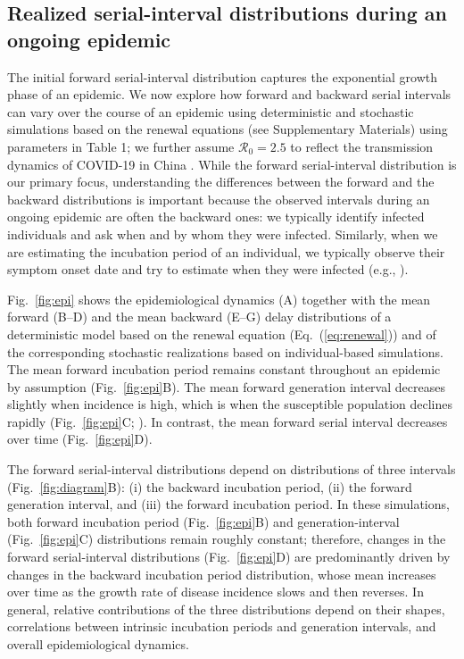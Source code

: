 \documentclass[12pt]{article}
\newcommand{\eref}[1]{Eq.~(\ref{eq:#1})}
\newcommand{\fref}[1]{Fig.~\ref{fig:#1}}
\newcommand{\Rx}[1]{\ensuremath{{\mathcal R}_{#1}}\xspace}
\newcommand{\Ro}{\Rx{0}}
\begin{document}
\subsection{Realized serial-interval distributions during an ongoing epidemic}

The initial forward serial-interval distribution captures the exponential growth phase of an epidemic.
We now explore how forward and backward serial intervals can vary over the course of an epidemic using deterministic and stochastic simulations based on the renewal equations (see Supplementary Materials) using parameters in Table 1;
we further assume $\Ro=2.5$ to reflect the transmission dynamics of COVID-19 in China \citep{doi:10.1098/rsif.2020.0144}.
While the forward serial-interval distribution is our primary focus, understanding the differences between the forward and the backward distributions is important because the observed intervals during an ongoing epidemic are often the backward ones:
we typically identify infected individuals and ask when and by whom they were infected.
Similarly, when we are estimating the incubation period of an individual, we typically observe their symptom onset date and try to estimate when they were infected (e.g., \cite{backer2020incubation}).

\fref{epi} shows the epidemiological dynamics (A) together with the mean forward (B--D) and the mean backward (E--G) delay distributions of a deterministic model based on the renewal equation (\eref{renewal}) and of the corresponding stochastic realizations based on individual-based simulations.
The mean forward incubation period remains constant throughout an epidemic by assumption (\fref{epi}B).
The mean forward generation interval decreases slightly when incidence is high, which is when the susceptible population declines rapidly (\fref{epi}C; \cite{kenah2008generation, champredon2015intrinsic}).
In contrast, the mean forward serial interval decreases over time (\fref{epi}D).

The forward serial-interval distributions depend on distributions of three intervals
(\fref{diagram}B): (i) the backward incubation period, (ii) the forward generation interval, and (iii) the forward incubation period.
In these simulations, both forward incubation period (\fref{epi}B) and generation-interval (\fref{epi}C) distributions remain roughly constant;
therefore, changes in the forward serial-interval distributions (\fref{epi}D) are predominantly driven by changes in the backward incubation period distribution, whose mean increases over time as the growth rate of disease incidence slows and then reverses.
In general, relative contributions of the three distributions depend on their shapes, correlations between intrinsic incubation periods and generation intervals, and overall epidemiological dynamics.
\end{document}

